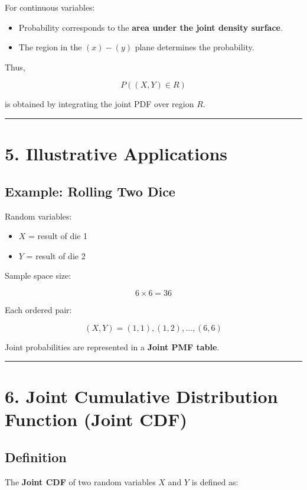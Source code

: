 \documentclass[12pt]{article}
\begin{document}
For continuous variables:

\begin{itemize}
\item Probability corresponds to the \textbf{area under the joint density surface}.
\item The region in the $(x)-(y)$ plane determines the probability.
\end{itemize}

Thus,

\[
P((X,Y) \in R)
\]

is obtained by integrating the joint PDF over region $R$.

\hrule
\vspace{0.5cm}

\section*{5. Illustrative Applications}

\subsection*{Example: Rolling Two Dice}

Random variables:

\begin{itemize}
\item $X$ = result of die 1
\item $Y$ = result of die 2
\end{itemize}

Sample space size:

\[
6 \times 6 = 36
\]

Each ordered pair:

\[
(X,Y) = (1,1), (1,2), \dots, (6,6)
\]

Joint probabilities are represented in a \textbf{Joint PMF table}.

\hrule
\vspace{0.5cm}

\newpage
\section*{6. Joint Cumulative Distribution Function (Joint CDF)}

\subsection*{Definition}

The \textbf{Joint CDF} of two random variables $X$ and $Y$ is defined as:
\end{document}
